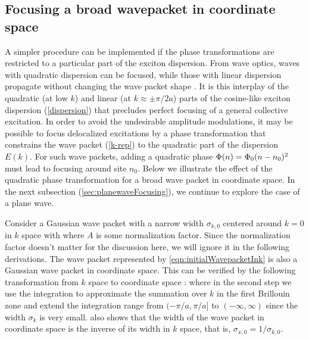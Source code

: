 \subsection{Focusing a broad wavepacket in coordinate space}
\label{sec:wavepacketFocusing}

A simpler procedure can be implemented if the phase transformations are restricted to a particular part of
the exciton dispersion.
From wave optics, waves with quadratic dispersion can be
focused, while those with linear dispersion propagate without changing
the wave packet shape \cite{focusing-books-1,focusing-books-2}. It is this interplay of the quadratic (at low $k$) and
 linear (at $k \approx \pm \pi/2a$) parts of the cosine-like exciton dispersion (\autoref{dispersion}) that precludes perfect  focusing of a general collective excitation.
In order to avoid the undesirable amplitude modulations, it may be possible to focus delocalized excitations by a phase transformation that
 constrains the wave packet (\ref{k-rep}) to the quadratic part of the dispersion $E(k)$.  For such wave packets, adding a quadratic phase
$\Phi(n) = \Phi_{0} (n-n_0)^2$ must lead to
focusing around site $n_0$. Below we illustrate the effect of the quadratic phase transformation for a broad wave packet in coordinate space. In the next subsection (\autoref{sec:planewaveFocusing}), we continue to explore the case of a plane wave. 



Consider a Gaussian wave packet with a narrow width $\sigma_{k, 0}$  centered around $k=0$ in $k$ space with
where $A$ is some normalization factor. Since the normalization factor doesn't matter for the discussion
 here, we will ignore it in the following derivations. The wave packet represented by
 \autoref{eqn:initialWavepacketInk} is also a Gaussian wave packet in coordinate space. This can be verified
by the following transformation from $k$ space to coordinate space :
where in the second step we use the integration to approximate the summation over $k$ in the first Brillouin zone and 
extend the integration range from $(-\pi/a, \pi/a]$ to $(-\infty, \infty)$ since the width $\sigma_k$ is very small. 
 also shows that the width of the wave packet in coordinate space is the 
inverse of its width in $k$ space, that is, $\sigma_{x, 0} = 1/\sigma_{k, 0}$. 

